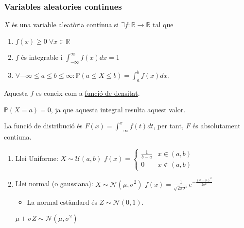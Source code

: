 \documentclass[../main.tex]{subfiles}
\begin{document}
    \subsubsection{Variables aleatories continues}
    \begin{definicio}
        $X$ és una variable aleatòria contínua si $\exists f: \mathbb{R} \to \mathbb{R}$ tal que
        \begin{enumerate}
            \item $f(x) \geq 0\; \forall x \in \mathbb{R}$
            \item $f$ és integrable i $\int_{-\infty}^{\infty} f(x) dx = 1$
            \item $\forall -\infty \leq a \leq b \leq \infty: \mathbb{P}\left(a\leq X\leq b\right) = \int_a^b f(x) dx$.
        \end{enumerate}
        Aquesta $f$ es coneix com a \underline{funció de densitat}.
    \end{definicio}
    \begin{proposicio}
        $\mathbb{P}\left(X = a\right) = 0$, ja que aquesta integral resulta aquest valor.
    \end{proposicio}
    \begin{proposicio}
        La funció de distribució és $F\left(x\right) = \int_{-\infty}^{x} f(t)dt$, per tant, $F$ és
        absolutament contiuna.
    \end{proposicio}
    \begin{enumerate}
        \item Llei Uniforme: $X \sim \mathcal{U}(a,b)$ $f(x) = \begin{cases}
            \frac{1}{b-a} & x \in (a,b)\\
            0 & x \not\in (a,b)
        \end{cases}$
        \item Llei normal (o gaussiana): $X \sim \mathcal{N}(\mu, \sigma^2)$ $f(x) = \frac{1}{\sqrt{2\pi\sigma^2}} e^{-\frac{\left(x-\mu\right)^2}{2\sigma^2}}$
        \begin{itemize}
            \item La normal estàndard és $Z \sim \mathcal{N}(0,1)$.
        \end{itemize}
        \begin{obs}
            $\mu + \sigma Z\sim \mathcal{N}(\mu, \sigma^2)$
        \end{obs}
    \end{enumerate}
\end{document}
